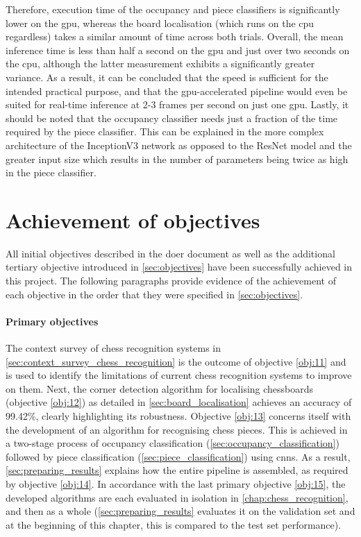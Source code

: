 \documentclass[../report.tex]{subfiles}
\begin{document}
Therefore, execution time of the occupancy and piece classifiers is significantly lower on the \gls{gpu}, whereas the board localisation (which runs on the \gls{cpu} regardless) takes a similar amount of time across both trials. 
Overall, the mean inference time is less than half a second on the \gls{gpu} and just over two seconds on the \gls{cpu}, although the latter measurement exhibits a significantly greater variance.
As a result, it can be concluded that the speed is sufficient for the intended practical purpose, and that the \gls{gpu}-accelerated pipeline would even be suited for real-time inference at 2-3 frames per second on just one \gls{gpu}.
Lastly, it should be noted that the occupancy classifier needs just a fraction of the time required by the piece classifier.
This can be explained in the more complex architecture of the InceptionV3 network as opposed to the ResNet model and the greater input size which results in the number of parameters being twice as high in the piece classifier.

\section{Achievement of objectives}
\label{sec:achievement_of_objectives}
All initial objectives described in the \gls{doer} document as well as the additional tertiary objective introduced in \cref{sec:objectives} have been successfully achieved in this project.
The following paragraphs provide evidence of the achievement of each objective in the order that they were specified in \cref{sec:objectives}.

\paragraph{Primary objectives}
The context survey of chess recognition systems in \cref{sec:context_survey_chess_recognition} is the outcome of objective \ref{obj:11} and is used to identify the limitations of current chess recognition systems to improve on them.
Next, the corner detection algorithm for localising chessboards (objective \ref{obj:12}) as detailed in \cref{sec:board_localisation} achieves an accuracy of 99.42\%, clearly highlighting its robustness.
Objective \ref{obj:13} concerns itself with the development of an algorithm for recognising chess pieces.
This is achieved in a two-stage process of occupancy classification (\cref{sec:occupancy_classification}) followed by piece classification (\cref{sec:piece_classification}) using \glspl{cnn}.
As a result, \cref{sec:preparing_results} explains how the entire pipeline is assembled, as required by objective \ref{obj:14}.
In accordance with the last primary objective \ref{obj:15}, the developed algorithms are each evaluated in isolation in \cref{chap:chess_recognition}, and then as a whole (\cref{sec:preparing_results} evaluates it on the validation set and at the beginning of this chapter, this is compared to the test set performance).
\end{document}
